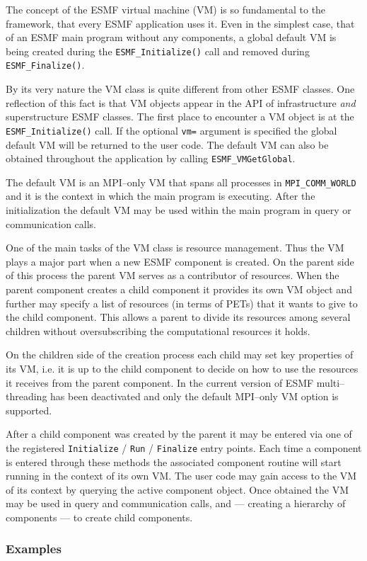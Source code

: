 
The concept of the ESMF virtual machine (VM) is so fundamental to the framework, that every ESMF application uses it. Even in the simplest case, that of an ESMF main program without any components, a global default VM is being created during the {\tt ESMF\_Initialize()} call and removed during {\tt ESMF\_Finalize()}.

By its very nature the VM class is quite different from other ESMF classes. One reflection of this fact is that VM objects appear in the API of infrastructure {\it and} superstructure ESMF classes. The first place to encounter a VM object is at the {\tt ESMF\_Initialize()} call. If the optional {\tt vm=} argument is specified the global default VM will be returned to the user code. The default VM can also be obtained throughout the application by calling {\tt ESMF\_VMGetGlobal}.

The default VM is an MPI--only VM that spans all processes in {\tt MPI\_COMM\_WORLD} and it is the context in which the main program is executing. After the initialization the default VM may be used within the main program in query or communication calls. 

One of the main tasks of the VM class is resource management. Thus the VM plays a major part when a new ESMF component is created. On the parent side of this process the parent VM serves as a contributor of resources. When the parent component creates a child component it provides its own VM object and further may specify a list of resources (in terms of PETs) that it wants to give to the child component. This allows a parent to divide its resources among several children without oversubscribing the computational resources it holds.

On the children side of the creation process each child may set key properties of its VM, i.e. it is up to the child component to decide on how to use the resources it receives from the parent component. In the current version of ESMF multi--threading has been deactivated and only the default MPI--only VM option is supported.


After a child component was created by the parent it may be entered via one of the registered {\tt Initialize} / {\tt Run} / {\tt Finalize} entry points. Each time a component is entered through these methods the associated component routine will start running in the context of its own VM. The user code may gain access to the VM of its context by querying the active component object. Once obtained the VM may be used in query and communication calls, and --- creating a hierarchy of components --- to create child components.
 

\subsubsection{Examples}
